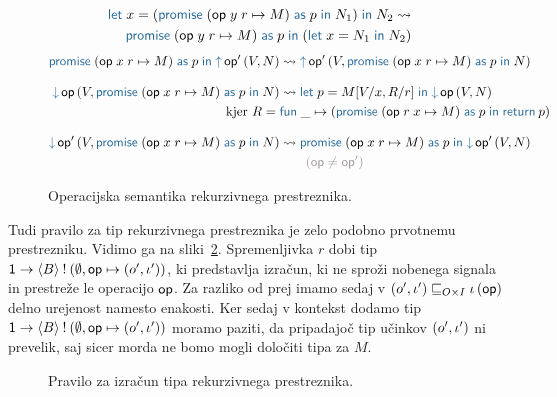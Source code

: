 \begin{figure}[H]
	\centering
	\small~
	\begin{align*}
		\tmlet{x}{(\tmwithrec{op}{y}{r}{M}{p}{N_1})}{N_2} \reduces \\
		\tmwithrec{op}{y}{r}{M}{p}{(\tmlet{x}{N_1}{N_2})}
	\end{align*}
	\vspace{-5ex}
	\begin{align*}
		\tmwithrec{op}{x}{r}{M}{p}{\tmopout{op'}{V}{N}} &\reduces \tmopout{op'}{V}{\tmwithrec{op}{x}{r}{M}{p}{N}}
		\razmik
		\tmopin{op}{V}{\tmwithrec{op}{x}{r}{M}{p}{N}} &\reduces \tmlet{p}{M[V/x, R/r]}{\tmopin{op}{V}{N}} \\
		\text{kjer }R = \;& \tmfunano{\_}{(\tmwithrec{op}{r}{x}{M}{p}{\tmreturn{p}})}
		\razmik
		\tmopin{op'}{V}{\tmwithrec{op}{x}{r}{M}{p}{N}} &\reduces \tmwithrec{op}{x}{r}{M}{p}{\tmopin{op'}{V}{N}} \\
		&\qquad {\color{rulenameColor}(\op \neq \op')}
	\end{align*}
	
	\caption{Operacijska semantika rekurzivnega prestreznika.}
	\label{fig:semantika-prestreznik}
\end{figure}

Tudi pravilo za tip rekurzivnega prestreznika je zelo podobno prvotnemu prestrezniku. Vidimo ga na sliki~\ref{fig:tipi-pravila-rekurzivni-prestreznik}. Spremenljivka $r$ dobi tip $\tyfun{\tyunit}{\tycomp{\typromise{B}}{\emptyset, \op \mapsto (\o', \i')}}$, ki predstavlja izračun, ki ne sproži nobenega signala in prestreže le operacijo $\op$.
Za razliko od prej imamo sedaj v $({\o'} , {\i'}) \order{O \times I} \i\, (\op)$ delno urejenost namesto enakosti. Ker sedaj v kontekst dodamo tip $\tyfun{\tyunit}{\tycomp{\typromise{B}}{\emptyset, \op \mapsto (\o', \i')}}$ moramo paziti, da pripadajoč tip učinkov $(\o', \i')$ ni prevelik, saj sicer morda ne bomo mogli določiti tipa za $M$.

\begin{figure}[H]
	\centering
	\small
	\begin{mathpar}
	\end{mathpar}
	
	\caption{Pravilo za izračun tipa rekurzivnega prestreznika.}
	\label{fig:tipi-pravila-rekurzivni-prestreznik}
\end{figure} 



